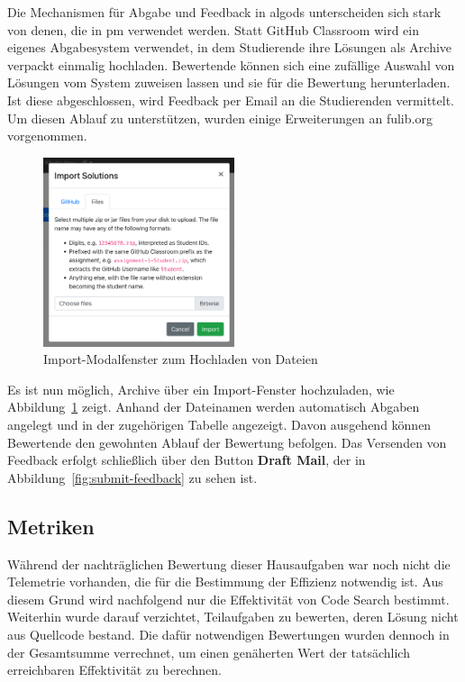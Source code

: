 Die Mechanismen für Abgabe und Feedback in \ac{algods} unterscheiden sich stark von denen, die in \ac{pm} verwendet werden.
Statt GitHub Classroom wird ein eigenes Abgabesystem verwendet, in dem Studierende ihre Lösungen als Archive verpackt einmalig hochladen.
Bewertende können sich eine zufällige Auswahl von Lösungen vom System zuweisen lassen und sie für die Bewertung herunterladen.
Ist diese abgeschlossen, wird Feedback per Email an die Studierenden vermittelt.
Um diesen Ablauf zu unterstützen, wurden einige Erweiterungen an fulib.org vorgenommen.

\begin{figure}
    \centering
    \includegraphics[width=0.5\textwidth]{images/assignment-import-files}
    \caption{Import-Modalfenster zum Hochladen von Dateien}
    \label{fig:assignment-import-files}
\end{figure}

Es ist nun möglich, Archive über ein Import-Fenster hochzuladen, wie Abbildung~\ref{fig:assignment-import-files} zeigt.
Anhand der Dateinamen werden automatisch Abgaben angelegt und in der zugehörigen Tabelle angezeigt.
Davon ausgehend können Bewertende den gewohnten Ablauf der Bewertung befolgen.
Das Versenden von Feedback erfolgt schließlich über den Button \textbf{Draft Mail}, der in Abbildung~\ref{fig:submit-feedback} zu sehen ist.

\subsection{Metriken}\label{subsec:algods-metrics}

Während der nachträglichen Bewertung dieser Hausaufgaben war noch nicht die Telemetrie vorhanden, die für die Bestimmung der Effizienz notwendig ist.
Aus diesem Grund wird nachfolgend nur die Effektivität von Code Search bestimmt.
Weiterhin wurde darauf verzichtet, Teilaufgaben zu bewerten, deren Lösung nicht aus Quellcode bestand.
Die dafür notwendigen Bewertungen wurden dennoch in der Gesamtsumme verrechnet, um einen genäherten Wert der tatsächlich erreichbaren Effektivität zu berechnen.


